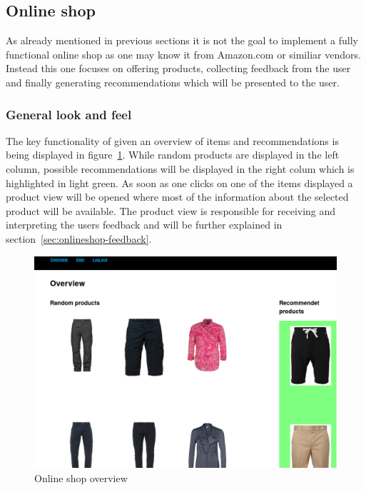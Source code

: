 
\subsection{Online shop}
\label{sec:online-shop}
As already mentioned in previous sections it is not the goal to implement a fully functional online shop as one may know it from Amazon.com or similiar vendors.
Instead this one focuses on offering products, collecting feedback from the user and finally generating recommendations which will be presented to the user.

\subsubsection{General look and feel}
The key functionality of given an overview of items and recommendations is being displayed in figure~\ref{fig:onlineshop-overview}.
While random products are displayed in the left column, possible recommendations will be displayed in the right colum which is highlighted in light green.
As soon as one clicks on one of the items displayed a product view will be opened where most of the information about the selected product will be available.
The product view is responsible for receiving and interpreting the users feedback and will be further explained in section~\ref{sec:onlineshop-feedback}.

\begin{figure}[h]
    \center
    \includegraphics[scale=0.3]{inc/implementation/onlineshop/recommender_onlineshop_overview}
    \caption{Online shop overview}
    \label{fig:onlineshop-overview}
\end{figure}

